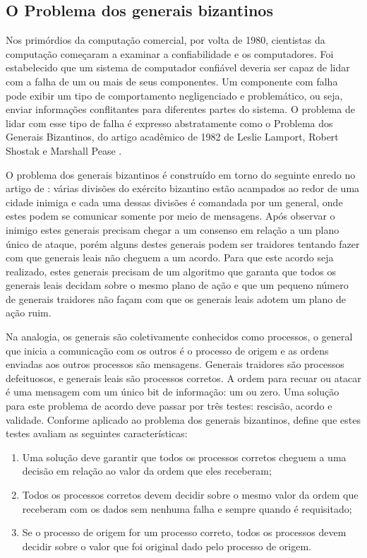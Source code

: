     \subsection{O Problema dos generais bizantinos}
    

           Nos primórdios da computação comercial, por volta de 1980, cientistas da computação começaram a examinar a confiabilidade e os computadores. Foi estabelecido que um sistema de computador confiável deveria ser capaz de lidar com a falha de um ou mais de seus componentes. Um componente com falha pode exibir um tipo de comportamento negligenciado e problemático, ou seja, enviar informações conflitantes para diferentes partes do sistema. O problema de lidar com esse tipo de falha é expresso abstratamente como o Problema dos Generais Bizantinos, do artigo acadêmico de 1982 de Leslie Lamport, Robert Shostak e Marshall Pease  \cite{blockchain_pratical_guide}.
           
           O problema dos generais bizantinos é construído em torno do seguinte enredo no artigo de : várias divisões do exército bizantino estão acampados ao redor de uma cidade inimiga e cada uma dessas divisões é comandada por um general, onde estes podem se comunicar somente por meio de mensagens. Após observar o inimigo estes generais precisam chegar a um consenso em relação a um plano único de ataque, porém alguns destes generais podem ser traidores tentando fazer com que generais leais não cheguem a um acordo. Para que este acordo seja realizado, estes generais precisam de um algoritmo que garanta que todos os generais leais decidam sobre o mesmo plano de ação e que um pequeno número de generais traidores não façam com que os generais leais adotem um plano de ação ruim.
           
            Na analogia, os generais são coletivamente conhecidos como processos, o general que inicia a comunicação com os outros é o processo de origem e as ordens enviadas aos outros processos são mensagens. Generais traidores são processos defeituosos, e generais leais são processos corretos. A ordem para recuar ou atacar é uma mensagem com um único bit de informação: um ou zero. Uma solução para este problema de acordo deve passar por três testes: rescisão, acordo e validade. Conforme aplicado ao problema dos generais bizantinos,  define que estes testes avaliam as seguintes características:
    
               \begin{enumerate}
                    \item Uma solução deve garantir que todos os processos corretos cheguem a uma decisão em relação ao valor da ordem que eles receberam;
                    \item Todos os processos corretos devem decidir sobre o mesmo valor da ordem que receberam com os dados sem nenhuma falha e sempre quando é requisitado;
                    \item Se o processo de origem for um processo correto, todos os processos devem decidir sobre o valor que foi original dado pelo processo de origem.
                \end{enumerate}
    
